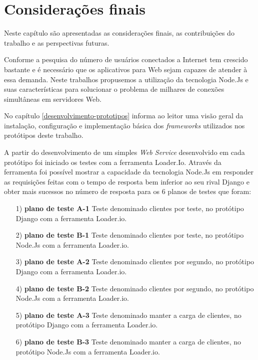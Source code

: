 

\chapter{Considerações finais}
\label{conslusao-e-trabalhos-furutos}
\vspace{-1.9cm}

  Neste capítulo são apresentadas as considerações finais, as contribuições do
  trabalho e as perspectivas futuras.

  Conforme a pesquisa do \cite{ibge} número de usuários conectados a Internet tem crescido bastante e é necessário
  que os aplicativos para Web sejam capazes de atender à essa demanda. Neste trabalhos propusemos 
  a utilização da tecnologia Node.Js e suas características para solucionar o problema de 
  milhares de conexões simultâneas em servidores Web.
  
  No capítulo \ref{desenvolvimento-prototipos} informa ao leitor uma visão geral da instalação, configuração e 
  implementação básica dos \textit{frameworks} utilizados nos protótipos deste trabalho.
  
  A partir do desenvolvimento de um simples \textit{Web Service} desenvolvido em cada protótipo foi iniciado os testes com a 
  ferramenta Loader.Io. Através da ferramenta foi possível mostrar a capacidade da tecnologia Node.Js em responder as requisições
  feitas com o tempo de resposta bem inferior ao seu rival Django e obter mais sucessos no número de resposta
  para os 6 planos de testes que foram: 
  
  \begin{enumerate}
   \item [1)] \textbf{plano de teste A-1} Teste denominado clientes por teste, no protótipo Django com a ferramenta Loader.io.
   \item [2)] \textbf{plano de teste B-1} Teste denominado clientes por teste, no protótipo Node.Js com a ferramenta Loader.io.
   \item [3)] \textbf{plano de teste A-2} Teste denominado clientes por segundo, no protótipo Django com a ferramenta Loader.io.
   \item [4)] \textbf{plano de teste B-2} Teste denominado clientes por segundo, no protótipo Node.Js com a ferramenta Loader.io.
   \item [5)] \textbf{plano de teste A-3} Teste denominado manter a carga de clientes, no protótipo Django com a ferramenta Loader.io.
   \item [6)] \textbf{plano de teste B-3} Teste denominado manter a carga de clientes, no protótipo Node.Js com a ferramenta Loader.io.
  \end{enumerate}

